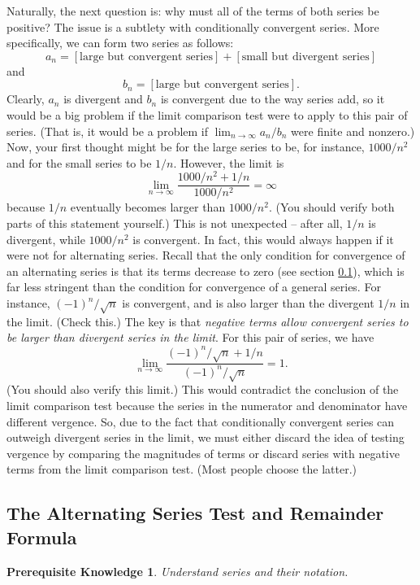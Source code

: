 \documentclass{myarticle}
\theoremstyle{nospace}
\newtheorem*{oldprereq}{Prerequisite Knowledge}
\newenvironment{prereq}
{\begin{mdframed}\begin{oldprereq}}
    {\end{oldprereq}\end{mdframed}}
\newtheorem{old series theorem}{Theorem}
\newenvironment{series theorem}
{\begin{mdframed}\begin{old series theorem}}
    {\end{old series theorem}\end{mdframed}}
\begin{document}
Naturally, the next question is: why must all of the terms of both
series be positive? The issue is a subtlety with conditionally
convergent series. More specifically, we can form two series as
follows:
\[
  a_n = [\text{large but convergent series}]
      + [\text{small but divergent  series}]
\]
and
\[
  b_n = [\text{large but convergent series}].
\]
Clearly, $a_n$ is divergent and $b_n$ is convergent due to the way
series add, so it would be a big problem if the limit comparison test
were to apply to this pair of series. (That is, it would be a problem
if $\lim_{n \to \infty} a_n/b_n$ were finite and nonzero.) Now, your
first thought might be for the large series to be, for instance,
$1000/n^2$ and for the small series to be $1/n$. However, the limit is
\[
  \lim_{n \to \infty} \frac{1000/n^2 + 1/n}{1000/n^2} = \infty
\]
because $1/n$ eventually becomes larger than $1000/n^2$. (You should
verify both parts of this statement yourself.) This is not unexpected
-- after all, $1/n$ is divergent, while $1000/n^2$ is convergent. In
fact, this would always happen if it were not for alternating series.
Recall that the only condition for convergence of an alternating
series is that its terms decrease to zero (see section
\ref{sec:alternating series test}), which is far less stringent than
the condition for convergence of a general series. For instance,
$(-1)^n/\sqrt{n}$ is convergent, and is also larger than the divergent
$1/n$ in the limit. (Check this.) The key is that \emph{negative terms
  allow convergent series to be larger than divergent series in the
  limit}. For this pair of series, we have
\[
  \lim_{n \to \infty}
  \frac{(-1)^n/\sqrt{n} + 1/n}{(-1)^n/\sqrt{n}} = 1.
\]
(You should also verify this limit.) This would contradict the
conclusion of the limit comparison test because the series in the
numerator and denominator have different vergence. So, due to the fact
that conditionally convergent series can outweigh divergent series in
the limit, we must either discard the idea of testing vergence by
comparing the magnitudes of terms or discard series with negative
terms from the limit comparison test. (Most people choose the latter.)

\subsection{The Alternating Series Test and Remainder Formula}
\label{sec:alternating series test}

\begin{prereq}
  Understand series and their notation.
\end{prereq}
\end{document}
